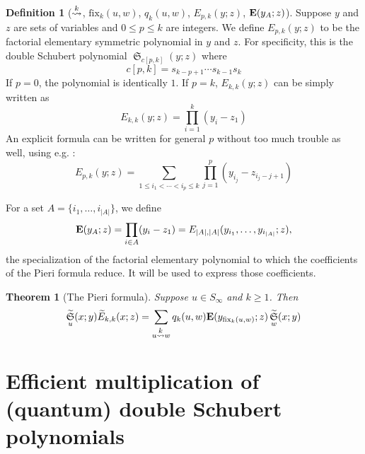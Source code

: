 \documentclass{amsart}
\newtheorem{theorem}[lemma]{Theorem}
\theoremstyle{definition}
\newtheorem{definition}[lemma]{Definition}
\theoremstyle{remark}
\numberwithin{equation}{section}
\DeclareMathOperator{\sch}{\mathfrak{S}}
\DeclareMathOperator{\qsch}{\widetilde{\mathfrak{S}}}
\newcommand{\xrightsquigarrow}[2][]{%
	\mathrel{\mathop{\rightsquigarrow}\limits^{\scriptstyle #2}%
	\ifx\hfuzz#1\hfuzz\else_{\scriptstyle #1}\fi}%
}
\newcommand{\tom}[1]{\ensuremath{\xrightsquigarrow{#1}}}
\newcommand{\fx}{\mathrm{fix}}
\begin{document}
\begin{definition}[$\tom{k}$, $\fx_{k}(u,w)$, $q_k(u,w)$, $E_{p,k}(y;z)$, $\mathbf{E}(y_A;z)$]
Suppose $y$ and $z$ are sets of variables and $0\leq p\leq k$ are integers. We define $E_{p,k}(y;z)$ to be the factorial elementary symmetric polynomial in $y$ and $z$. For specificity, this is the double Schubert polynomial $\sch_{c[p,k]}(y;z)$ where
$$c[p,k] = s_{k-p+1}\cdots s_{k-1}s_k$$
If $p=0$, the polynomial is identically $1$. If $p=k$, $E_{k,k}(y;z)$ can be simply written as
$$E_{k,k}(y;z)=\prod_{i=1}^k(y_i-z_1)$$
An explicit formula can be written for general $p$ without too much trouble as well, using e.g. \cite{molev1999littlewood}:
$$E_{p,k}(y;z)=\sum_{1\leq i_1<\cdots<i_p\leq k}\prod_{j=1}^p(y_{i_j}-z_{i_j-j+1})$$

For a set $A=\{i_1,\ldots,i_{|A|}\}$, we define
$$\mathbf{E}(y_A;z)=\prod_{i\in A}(y_i-z_1)=E_{|A|,|A|}(y_{i_1},\ldots,y_{i_{|A|}};z),$$
the specialization of the factorial elementary polynomial to which the coefficients of the Pieri formula reduce. It will be used to express those coefficients.
\end{definition}


\begin{theorem}[The Pieri formula] \label{theorem:pieri}
Suppose $u\in S_\infty$ and $k\geq 1$. Then
$$\qsch_u(x;y)\qelem_{k,k}(x;z)=\sum_{u\tom{k} w}q_k(u,w)\wte(y_{\fx_{k}(u,w)};z)\qsch_w(x;y)$$
\end{theorem}




\newcommand{\lom}{\widetilde{\lambda}}
\newcommand{\mom}{\widetilde{\mu}}
\newcommand{\thop}{\widetilde{\theta}}
\newcommand{\medperm}{\overline{\mu}}
\newcommand{\medtheta}{\overline{\theta}}
\newcommand{\Tom}[1]{\xRightarrow{#1}}
\newcommand{\dom}{\mu}

\section{Efficient multiplication of (quantum) double Schubert polynomials}
\end{document}
